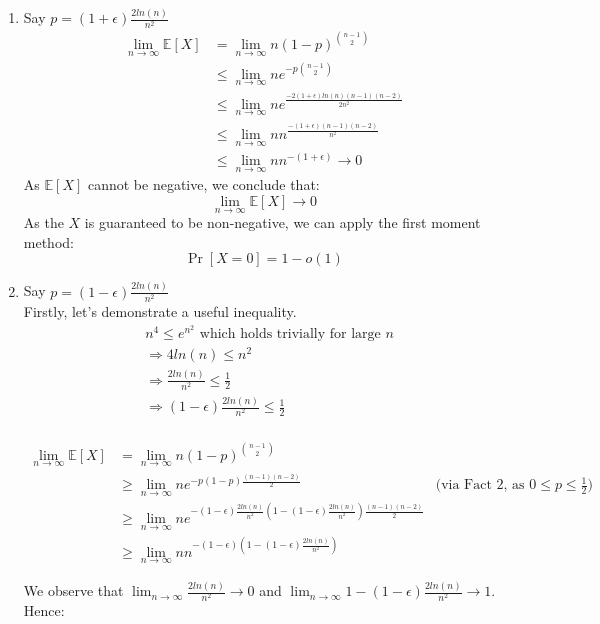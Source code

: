 \documentclass[a4paper,german]{article}
\begin{document}
\begin{enumerate}

\item Say \(p = (1+\epsilon)\frac{2ln(n)}{n^2} \)
\begin{align*}
\lim_{n \to \infty} \mathbb{E}[X] &= \lim_{n \to \infty} n (1-p)^ {{n-1} \choose {2}} \\
&\leq \lim_{n \to \infty} n e^{-p{{n-1} \choose {2}}} \\
&\leq \lim_{n \to \infty} n e^{\frac{-2(1+ \epsilon) ln(n)(n-1)(n-2)}{2n^2}} \\
&\leq \lim_{n \to \infty} n n^{\frac{-(1+ \epsilon) (n-1)(n-2)}{n^2}} \\
&\leq \lim_{n \to \infty} n n^{-(1+ \epsilon)} \to 0
\end{align*}
As \(\mathbb{E}[X]\) cannot be negative, we conclude that:
$$ \lim_{n \to \infty} \mathbb{E}[X] \to 0$$
As the \(X\) is guaranteed to be non-negative, we can apply the first moment method:
$$ \Pr[X = 0] = 1 - o(1)$$

\item Say \(p = (1- \epsilon)\frac{2ln(n)}{n^2} \) \\

Firstly, let's demonstrate a useful inequality.
\begin{align*}
& n^4 \leq e^{n^2} \text{ which holds trivially for large \(n\)} \\
&\Rightarrow 4ln(n) \leq n^2\\
& \Rightarrow \frac{2ln(n)}{n^2} \leq \frac{1}{2}\\
& \Rightarrow (1-\epsilon) \frac{2ln(n)}{n^2} \leq \frac{1}{2}\\
\end{align*}

\begin{align*}
\lim_{n \to \infty} \mathbb{E}[X] &= \lim_{n \to \infty} n (1-p)^ {{n-1} \choose {2}} \\
&\geq \lim_{n \to \infty} n e^{-p(1 - p) \frac{(n-1)(n-2)}{2}}   & \text{(via Fact 2, as } 0 \leq p \leq \frac{1}{2} \text{)}\\
&\geq  \lim_{n \to \infty} n e^{ - (1 - \epsilon) \frac{2 ln(n)}{n^2} (1-(1-\epsilon)\frac{2ln(n)}{n^2}) \frac{(n-1)(n-2)}{2}}\\
&\geq \lim_{n \to \infty} n n^{- (1-\epsilon) (1 - (1- \epsilon)\frac{2ln(n)}{n^2})} 
\end{align*}

We observe that 
\( \lim_{n \to \infty} \frac{2ln(n)}{n^2} \to 0 \) and \( \lim_{n \to \infty} 1 - (1-\epsilon)\frac{2ln(n)}{n^2} \to 1 \).
Hence:


\end{enumerate}
\end{document}
